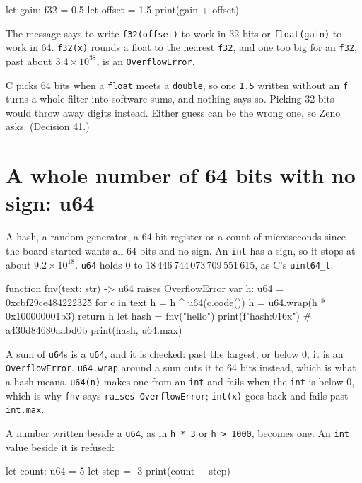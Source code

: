 \begin{zeno}[fails=yes]
let gain: f32 = 0.5
let offset = 1.5
print(gain + offset)
\end{zeno}

The message says to write \verb|f32(offset)| to work in 32 bits or
\verb|float(gain)| to work in 64. \verb|f32(x)| rounds a float to the
nearest \verb|f32|, and one too big for an \verb|f32|, past about
$3.4 \times 10^{38}$, is an \verb|OverflowError|.

\begin{why}
C picks 64 bits when a \verb|float| meets a \verb|double|, so one
\verb|1.5| written without an \verb|f| turns a whole filter into
software sums, and nothing says so. Picking 32 bits would throw away
digits instead. Either guess can be the wrong one, so Zeno asks.
(Decision 41.)
\end{why}

\section{A whole number of 64 bits with no sign: u64}

A hash, a random generator, a 64-bit register or a count of
microseconds since the board started wants all 64 bits and no sign.
An \verb|int| has a sign, so it stops at about $9.2 \times 10^{18}$.
\verb|u64| holds 0 to 18\,446\,744\,073\,709\,551\,615, as C's
\verb|uint64_t|.

\begin{zeno}
function fnv(text: str) -> u64 raises OverflowError {
    var h: u64 = 0xcbf29ce484222325
    for c in text {
        h = h ^ u64(c.code())
        h = u64.wrap(h * 0x100000001b3)
    }
    return h
}
let hash = fnv("hello")
print(f"{hash:016x}")      # a430d84680aabd0b
print(hash, u64.max)
\end{zeno}

A sum of \verb|u64|s is a \verb|u64|, and it is checked: past the
largest, or below 0, it is an \verb|OverflowError|. \verb|u64.wrap|
around a sum cuts it to 64 bits instead, which is what a hash means.
\verb|u64(n)| makes one from an \verb|int| and fails when the
\verb|int| is below 0, which is why \verb|fnv| says
\verb|raises OverflowError|; \verb|int(x)| goes back and fails past
\verb|int.max|.

A number written beside a \verb|u64|, as in \verb|h * 3| or
\verb|h > 1000|, becomes one. An \verb|int| value beside it is
refused:

\begin{zeno}[fails=yes]
let count: u64 = 5
let step = -3
print(count + step)
\end{zeno}

